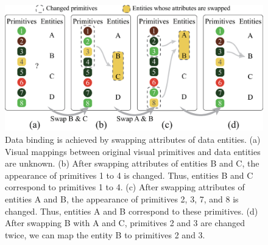 \begin{figure}
    \centering
    \includegraphics[width=1\columnwidth]{figures/DataBinding.eps}
    \caption{Data binding is achieved by swapping attributes of data entities. (a) Visual mappings between original visual primitives and data entities are unknown. (b) After swapping attributes of entities B and C, the appearance of primitives 1 to 4 is changed. Thus, entities B and C correspond to primitives 1 to 4. (c) After swapping attributes of entities A and B, the appearance of primitives 2, 3, 7, and 8 is changed. Thus, entities A and B correspond to these primitives. (d) After swapping B with A and C, primitives 2 and 3 are changed twice, we can map the entity B to primitives 2 and 3.}
    \label{fig:DataBinding}
\end{figure}

